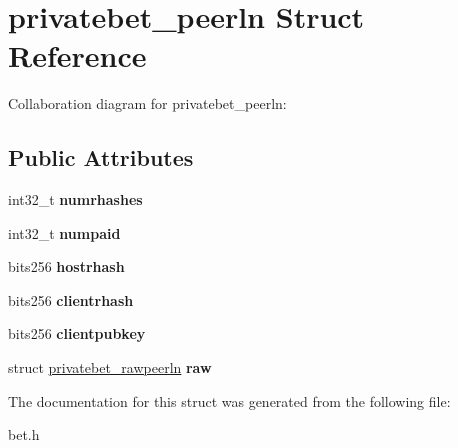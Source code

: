 \hypertarget{structprivatebet__peerln}{}\section{privatebet\+\_\+peerln Struct Reference}
\label{structprivatebet__peerln}


Collaboration diagram for privatebet\+\_\+peerln\+:
\subsection*{Public Attributes}
\begin{DoxyCompactItemize}
\item 
\mbox{\label{structprivatebet__peerln_accd8b1a6dd4f84596603abfe1401c886}} 
int32\+\_\+t {\bfseries numrhashes}
\item 
\mbox{\label{structprivatebet__peerln_abcb19c688a0e4f8c4e4854079526899f}} 
int32\+\_\+t {\bfseries numpaid}
\item 
\mbox{\label{structprivatebet__peerln_a1bdfd627f7ae81d4b09a245173e42773}} 
bits256 {\bfseries hostrhash}
\item 
\mbox{\label{structprivatebet__peerln_a0260b68acba6b1658e2e2b73b2586cdc}} 
bits256 {\bfseries clientrhash}
\item 
\mbox{\label{structprivatebet__peerln_a6324e33f89ff4379976cfa983bc58065}} 
bits256 {\bfseries clientpubkey}
\item 
\mbox{\label{structprivatebet__peerln_ab2eaa65aa69210d0dc5431f5d3a27b56}} 
struct \hyperlink{structprivatebet__rawpeerln}{privatebet\+\_\+rawpeerln} {\bfseries raw}
\end{DoxyCompactItemize}


The documentation for this struct was generated from the following file\+:\begin{DoxyCompactItemize}
\item 
bet.\+h\end{DoxyCompactItemize}

